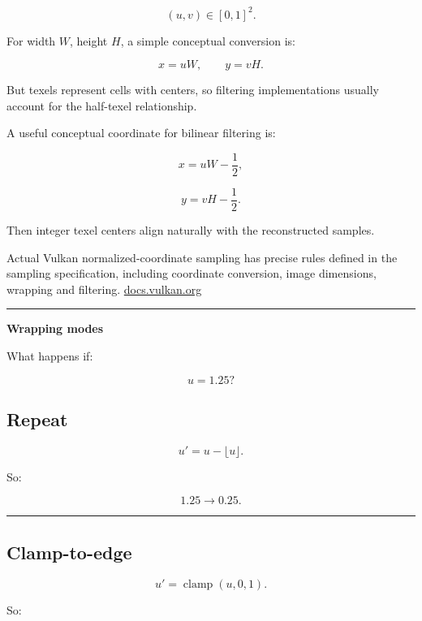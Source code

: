 \[
(u,v)\in[0,1]^2.
\]

For width \(W\), height \(H\), a simple conceptual conversion is:

\[
x=uW,
\qquad
y=vH.
\]

But texels represent cells with centers, so filtering implementations usually account for the half-texel relationship.

A useful conceptual coordinate for bilinear filtering is:

\[
x=uW-\frac12,
\]

\[
y=vH-\frac12.
\]

Then integer texel centers align naturally with the reconstructed samples.

Actual Vulkan normalized-coordinate sampling has precise rules defined in the sampling specification, including coordinate conversion, image dimensions, wrapping and filtering. \href{https://docs.vulkan.org/spec/latest/chapters/textures.html?utm_source=chatgpt.com}{docs.vulkan.org}

\begin{center}\rule{0.5\linewidth}{0.5pt}\end{center}

\textbf{Wrapping modes}

What happens if:

\[
u=1.25?
\]

\subsection{Repeat}\label{03-visual-computing-i-ch019-repeat}

\hypertarget{03-visual-computing-i-ch019-repeat}{}

\[
u'=u-\lfloor u\rfloor.
\]

So:

\[
1.25\rightarrow0.25.
\]

\begin{center}\rule{0.5\linewidth}{0.5pt}\end{center}

\subsection{Clamp-to-edge}\label{03-visual-computing-i-ch019-clamp-to-edge}

\hypertarget{03-visual-computing-i-ch019-clamp-to-edge}{}

\[
u'=
\operatorname{clamp}(u,0,1).
\]

So:

